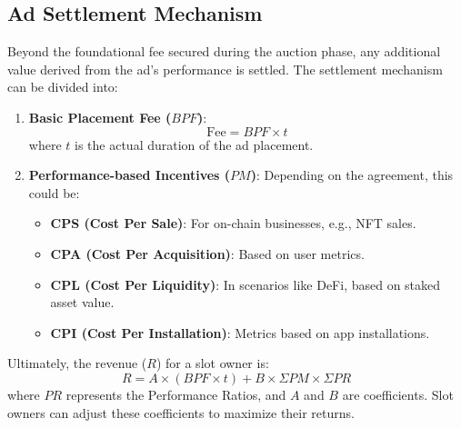 \subsection{Ad Settlement Mechanism}

Beyond the foundational fee secured during the auction phase, any additional value derived from the ad's performance is settled. The settlement mechanism can be divided into:

\begin{enumerate}
    \item \textbf{Basic Placement Fee (\( BPF \))}: 
    \begin{equation}
    \text{Fee} = BPF \times t
    \end{equation}
    where \( t \) is the actual duration of the ad placement.

    \item \textbf{Performance-based Incentives (\( PM \))}: Depending on the agreement, this could be:
    \begin{itemize}
        \item \textbf{CPS (Cost Per Sale)}: For on-chain businesses, e.g., NFT sales.
        \item \textbf{CPA (Cost Per Acquisition)}: Based on user metrics.
        \item \textbf{CPL (Cost Per Liquidity)}: In scenarios like DeFi, based on staked asset value.
        \item \textbf{CPI (Cost Per Installation)}: Metrics based on app installations.
    \end{itemize}
\end{enumerate}

Ultimately, the revenue (\( R \)) for a slot owner is:
\begin{equation}
R = A \times (BPF \times t) + B \times \Sigma PM \times \Sigma PR
\end{equation}
where \( PR \) represents the Performance Ratios, and \( A \) and \( B \) are coefficients. Slot owners can adjust these coefficients to maximize their returns.


